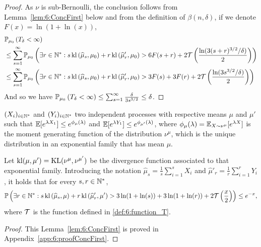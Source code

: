 \begin{proof}
As $\nu$ is sub-Bernoulli, the conclusion follows from Lemma~\ref{lem:6:ConcFirst} below and from the definition of $\beta(n,\delta)$, if we denote $F(x)=\ln(1+\ln(x))$,
%
\begin{align*}
    &\mathbb{P}_{\mu_0}\left(T_{\delta} < \infty\right) \\
    & \leq \sum_{s =1}^{\infty} \mathbb{P}_{\mu_0}\left(\exists r \in \mathbb{N}^* : s \, \mathrm{kl}\left(\widehat{\mu}_{s},\mu_0\right) + r \, \mathrm{kl}\left(\widehat{\mu}'_{r},\mu_0\right) > 6F(s+r)+ 2 \mathcal{T}\left(\frac{\ln(3(s+r)^{3/2}/\delta)}{2}\right)\right)\\
    & \leq \sum_{s =1}^{\infty} \mathbb{P}_{\mu_0}\left(\exists r \in \mathbb{N}^* : s \, \mathrm{kl}\left(\widehat{\mu}_{s},\mu_0\right) + r \, \mathrm{kl}\left(\widehat{\mu}'_{r},\mu_0\right) > 3F(s)+3F(r) + 2 \mathcal{T}\left(\frac{\ln(3s^{3/2}/\delta)}{2}\right)\right)
\end{align*}
%
And so we have $\mathbb{P}_{\mu_0}\left(T_{\delta} < \infty\right) \leq \sum_{s =1}^{\infty} \frac{\delta}{3s^{3/2}} \leq \delta$.
%
\end{proof}

\begin{lemma}\label{lem:6:ConcFirst}
    $(X_i)_{i \in \mathbb{N}^*}$ and $(Y_i)_{i \in \mathbb{N}^*}$ two independent \iid{} processes with respective means $\mu$ and $\mu'$ such that
    $\mathbb{E}[e^{\lambda X_1}] \leq e^{\phi_{\mu}(\lambda)}$ and $\mathbb{E}[e^{\lambda Y_1}] \leq e^{\phi_{\mu'}(\lambda)}$,
    where $\phi_\mu(\lambda) = \mathbb{E}_{X \sim \nu^{\mu}}[e^{\lambda X}]$ is the moment generating function of the distribution $\nu^\mu$, which is the unique distribution in an exponential family that has mean $\mu$.

    Let $\mathrm{kl}(\mu,\mu') = \mathrm{KL}(\nu^\mu,\nu^{\mu'})$ be the divergence function associated to that exponential family. Introducing the notation $\widehat{\mu}_s = \frac{1}{s}\sum\limits_{i=1}^s X_i$ and $\widehat{\mu}'_r = \frac{1}{r}\sum\limits_{i=1}^r Y_i$, it holds that for every $s,r \in \mathbb{N}^*$,
    \[\mathbb{P}\left(\exists r \in \mathbb{N}^* : s \, \mathrm{kl}\left(\widehat{\mu}_{s},\mu\right) + r \, \mathrm{kl}\left(\widehat{\mu}_r',\mu'\right) > 3\ln(1+\ln(s)) + 3\ln(1+\ln(r)) + 2\mathcal{T}\left(\frac{x}{2}\right)\right)\leq e^{-x},\]
    where $\mathcal{T}$ is the function defined in \eqref{def:6:function_T}.
\end{lemma}
\begin{proof}
    This Lemma~\ref{lem:6:ConcFirst} is proved in Appendix~\ref{app:6:proofConcFirst}.
\end{proof}



